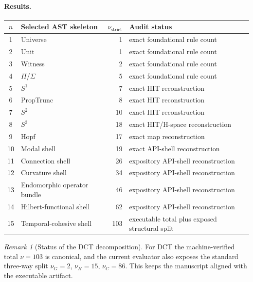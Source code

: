\documentclass[11pt,a4paper]{article}
\theoremstyle{plain}
\theoremstyle{definition}
\theoremstyle{remark}
\newtheorem{remark}[theorem]{Remark}
\begin{document}
\paragraph{Results.}
\begin{center}
\small
\begin{tabular}{@{}cl rl@{}}
\toprule
$n$ & Selected AST skeleton & $\nu_{\mathrm{strict}}$ & Audit status \\
\midrule
1  & Universe         & 1  & exact foundational rule count \\
2  & Unit             & 1  & exact foundational rule count \\
3  & Witness          & 2  & exact foundational rule count \\
4  & $\Pi$/$\Sigma$   & 5  & exact foundational rule count \\
5  & $S^1$            & 7  & exact HIT reconstruction \\
6  & PropTrunc        & 8  & exact HIT reconstruction \\
7  & $S^2$            & 10 & exact HIT reconstruction \\
8  & $S^3$            & 18 & exact HIT/H-space reconstruction \\
9  & Hopf             & 17 & exact map reconstruction \\
10 & Modal shell      & 19 & exact API-shell reconstruction \\
11 & Connection shell & 26 & expository API-shell reconstruction \\
12 & Curvature shell  & 34 & expository API-shell reconstruction \\
13 & Endomorphic operator bundle & 46 & expository API-shell reconstruction \\
14 & Hilbert-functional shell & 62 & expository API-shell reconstruction \\
15 & Temporal-cohesive shell & 103 & executable total plus exposed structural split \\
\bottomrule
\end{tabular}
\end{center}

\begin{remark}[Status of the DCT decomposition]
For DCT the machine-verified total $\nu = 103$ is canonical, and the current evaluator also exposes the standard three-way split $\nu_G=2$, $\nu_H=15$, $\nu_C=86$.
This keeps the manuscript aligned with the executable artifact.
\end{remark}
\end{document}
